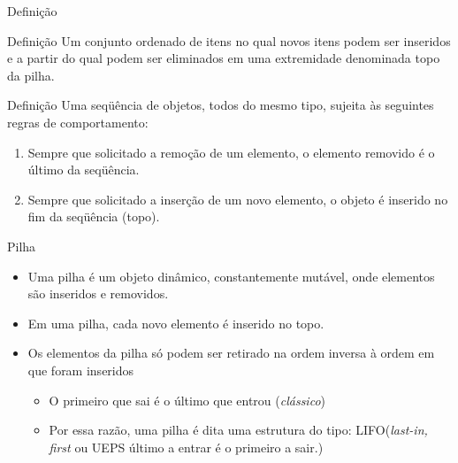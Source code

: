   
  
  
   \begin{frame}{Definição}
     \begin{block}{Definição}
       Um conjunto ordenado de itens no qual novos itens podem ser 
       inseridos e a partir do qual podem ser eliminados em uma 
       extremidade denominada \alert{topo} da pilha.
     \end{block}
     \pause
     \begin{block}{Definição}
       Uma seqüência de objetos, todos do mesmo tipo, sujeita às
        seguintes regras de comportamento:       
				\begin{enumerate}
					\item Sempre que solicitado a remoção de um elemento, o elemento removido é o último da seqüência.
					\item Sempre que solicitado a inserção de um novo elemento, 
					       o objeto é inserido no fim da seqüência (\alert{topo}).
				\end{enumerate}
     \end{block}  
   \end{frame}
  
   \begin{frame}{Pilha}     
			\begin{itemize}
				\item Uma pilha é um objeto dinâmico, constantemente mutável, onde elementos são inseridos e removidos.
				\item Em uma pilha, cada novo elemento é inserido no topo.
				\item Os elementos da pilha só podem ser retirado na ordem inversa à ordem em que foram inseridos				
					\begin{itemize}
						\item O primeiro que sai é o último que entrou (\textit{clássico})
						\item Por essa razão, uma pilha é dita uma estrutura 
						do tipo: \alert{LIFO}(\textit{last-in, first} ou UEPS último a entrar é o primeiro a sair.)
					\end{itemize}
			\end{itemize}
  \end{frame}
  
